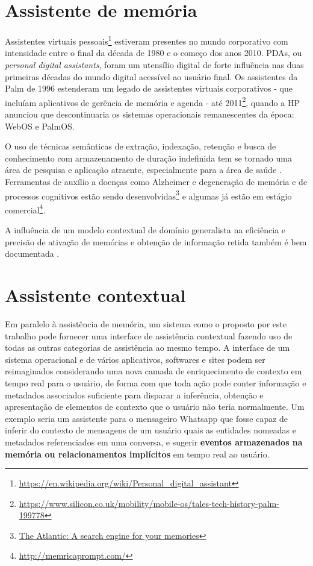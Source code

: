 \section{Assistente de memória}

Assistentes virtuais pessoais\footnote{\url{https://en.wikipedia.org/wiki/Personal_digital_assistant}} estiveram presentes no mundo corporativo com intensidade entre o final da década de 1980 e o começo dos anos 2010. PDAs, ou \textit{personal digital assistants}, foram um utensílio digital de forte influência nas duas primeiras décadas do mundo digital acessível ao usuário final. Os assistentes da Palm de 1996 estenderam um legado de assistentes virtuais corporativos - que incluíam aplicativos de gerência de memória e agenda - até 2011\footnote{\url{https://www.silicon.co.uk/mobility/mobile-os/tales-tech-history-palm-199778}}, quando a HP anunciou que descontinuaria os sistemas operacionais remanescentes da época: WebOS e PalmOS.

O uso de técnicas semânticas de extração, indexação, retenção e busca de conhecimento com armazenamento de duração indefinida tem se tornado uma área de pesquisa e aplicação atraente, especialmente para a área de saúde \cite{Costa2010MultiagentPM, Huang2012TowardAM}. Ferramentas de auxílio a doenças como Alzheimer e degeneração de memória e de processos cognitivos estão sendo desenvolvidas\footnote{\href{https://www.theatlantic.com/technology/archive/2016/01/sorry-dave-afraid-i-cant-do-that/431559/}{The Atlantic: A search engine for your memories}} e algumas já estão em estágio comercial\footnote{\url{http://memricaprompt.com/}}.

A influência de um modelo contextual de domínio generalista na eficiência e precisão de ativação de memórias e obtenção de informação retida também é bem documentada \cite{Agarwal2017RememberingWY,Liu2017AnET,Ma2015KnowledgeGI,HakkaniTr2014ProbabilisticEO}.

\section{Assistente contextual}

Em paralelo à assistência de memória, um sistema como o proposto por este trabalho pode fornecer uma interface de assistência contextual fazendo uso de todas as outras categorias de assistência ao mesmo tempo. A interface de um sistema operacional e de vários aplicativos, softwares e sites podem ser reimaginados considerando uma nova camada de enriquecimento de contexto em tempo real para o usuário, de forma com que toda ação pode conter informação e metadados associados suficiente para disparar a inferência, obtenção e apresentação de elementos de contexto que o usuário não teria normalmente. Um exemplo seria um assistente para o mensageiro Whatsapp que fosse capaz de inferir do contexto de mensagens de um usuário quais as entidades nomeadas e metadados referenciados em uma conversa, e sugerir \textbf{eventos armazenados na memória ou relacionamentos implícitos} em tempo real ao usuário.

